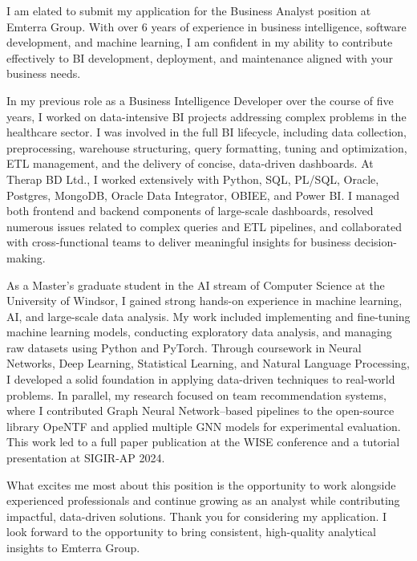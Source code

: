 I am elated to submit my application for the Business Analyst position at Emterra Group. With over 6 years of experience in business intelligence, software development, and machine learning, I am confident in my ability to contribute effectively to BI development, deployment, and maintenance aligned with your business needs.

\vspace{0.5em}

In my previous role as a Business Intelligence Developer over the course of five years, I worked on data-intensive BI projects addressing complex problems in the healthcare sector. I was involved in the full BI lifecycle, including data collection, preprocessing, warehouse structuring, query formatting, tuning and optimization, ETL management, and the delivery of concise, data-driven dashboards. At Therap BD Ltd., I worked extensively with Python, SQL, PL/SQL, Oracle, Postgres, MongoDB, Oracle Data Integrator, OBIEE, and Power BI. I managed both frontend and backend components of large-scale dashboards, resolved numerous issues related to complex queries and ETL pipelines, and collaborated with cross-functional teams to deliver meaningful insights for business decision-making.

\vspace{0.5em}

As a Master’s graduate student in the AI stream of Computer Science at the University of Windsor, I gained strong hands-on experience in machine learning, AI, and large-scale data analysis. My work included implementing and fine-tuning machine learning models, conducting exploratory data analysis, and managing raw datasets using Python and PyTorch. Through coursework in Neural Networks, Deep Learning, Statistical Learning, and Natural Language Processing, I developed a solid foundation in applying data-driven techniques to real-world problems. In parallel, my research focused on team recommendation systems, where I contributed Graph Neural Network–based pipelines to the open-source library OpeNTF and applied multiple GNN models for experimental evaluation. This work led to a full paper publication at the WISE conference and a tutorial presentation at SIGIR-AP 2024.

\vspace{0.5em}

What excites me most about this position is the opportunity to work alongside experienced professionals and continue growing as an analyst while contributing impactful, data-driven solutions. Thank you for considering my application. I look forward to the opportunity to bring consistent, high-quality analytical insights to Emterra Group.